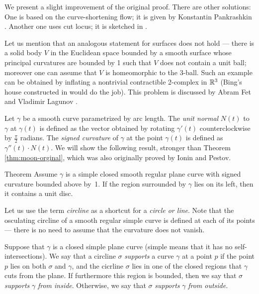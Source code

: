 \documentclass{article}
\begin{document}
We present %
a slight improvement of the original proof.
There are other solutions: 
One is based on the curve-shortening flow; it is given by Konstantin Pankrashkin  \cite{pankrashkin}.
Another one uses cut locus; it is sketched in %
\cite[Problem 1.7.19]{toponogov}.

Let us mention that an analogous statement for surfaces does not hold --- there is a solid body $V$ in the Euclidean space bounded by a smooth surface whose principal curvatures are bounded by 1 such that $V$ does not contain a unit ball; moreover one can assume that $V$ is homeomorphic to the 3-ball.
Such an example can be obtained by inflating a nontrivial contractible 2-complex in $\mathbb{R}^3$ 
(Bing's house constructed in \cite{bing} would do the job).
This problem is discussed by Abram Fet and Vladimir Lagunov \cite{lagunov-2,lagunov-fet}%
.

\medskip


Let $\gamma $ be a smooth curve parametrized by arc length. The \emph{unit normal} $N(t)$ to $\gamma$ at $\gamma (t)$ is defined as the vector obtained by rotating $\gamma '(t)$ counterclockwise by $\frac{\pi}{2}$ radians. The \emph{ signed curvature} of $\gamma$ at the point $\gamma (t)$ is defined as $\gamma '' (t) \cdot N (t) $. We will show the following result, stronger than Theorem \ref{thm:moon-orginal}, which was also originally proved by Ionin and Pestov.  





\begin{thm}{Theorem}\label{thm:moon-strong}
Assume $\gamma$ is a simple closed smooth regular plane curve with signed curvature bounded above by~1. If the region surrounded by $\gamma$ lies on its left, then it contains a unit disc.
\end{thm}





Let us use the term \emph{circline} as a shortcut for a \emph{circle or line}.
Note that the osculating circline of a smooth regular simple curve is defined at each of its points --- there is no need to assume that the curvature does not vanish.

Suppose that $\gamma$ is a closed simple plane curve (simple means that it has no self-intersections).
We say that a circline $\sigma$ \emph{supports} a curve $\gamma$ at a point $p$ if the point $p$ lies on both $\sigma$ and $\gamma$, and the cicrline $\sigma$ lies in one of the closed regions that $\gamma$ cuts from the plane.
If furthermore this region is bounded, then  we say that $\sigma$ \emph{supports} $\gamma$ \emph{from inside}.
Otherwise, we say that $\sigma$ \emph{supports} $\gamma$ \emph{from outside}.
\end{document}
